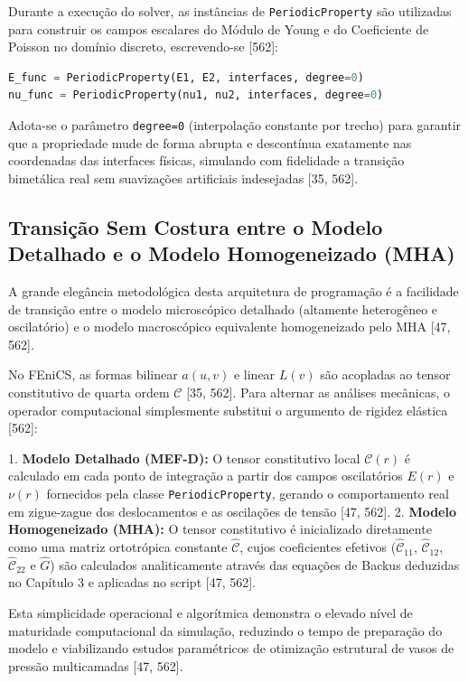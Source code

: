 Durante a execução do solver, as instâncias de \texttt{PeriodicProperty} são utilizadas para construir os campos escalares do Módulo de Young e do Coeficiente de Poisson no domínio discreto, escrevendo-se [562]:

\begin{lstlisting}[language=Python, caption={Instanciação dos campos de propriedades no script FEniCS.}]
E_func = PeriodicProperty(E1, E2, interfaces, degree=0)
nu_func = PeriodicProperty(nu1, nu2, interfaces, degree=0)
\end{lstlisting}

Adota-se o parâmetro \texttt{degree=0} (interpolação constante por trecho) para garantir que a propriedade mude de forma abrupta e descontínua exatamente nas coordenadas das interfaces físicas, simulando com fidelidade a transição bimetálica real sem suavizações artificiais indesejadas [35, 562].

\subsection{Transição Sem Costura entre o Modelo Detalhado e o Modelo Homogeneizado (MHA)}

A grande elegância metodológica desta arquitetura de programação é a facilidade de transição entre o modelo microscópico detalhado (altamente heterogêneo e oscilatório) e o modelo macroscópico equivalente homogeneizado pelo MHA [47, 562].

No FEniCS, as formas bilinear $a(u,v)$ e linear $L(v)$ são acopladas ao tensor constitutivo de quarta ordem $\mathcal{C}$ [35, 562]. Para alternar as análises mecânicas, o operador computacional simplesmente substitui o argumento de rigidez elástica [562]:

1. \textbf{Modelo Detalhado (MEF-D):} O tensor constitutivo local $\mathcal{C}(r)$ é calculado em cada ponto de integração a partir dos campos oscilatórios $E(r)$ e $\nu(r)$ fornecidos pela classe \texttt{PeriodicProperty}, gerando o comportamento real em zigue-zague dos deslocamentos e as oscilações de tensão [47, 562].
2. \textbf{Modelo Homogeneizado (MHA):} O tensor constitutivo é inicializado diretamente como uma matriz ortotrópica constante $\hat{\mathcal{C}}$, cujos coeficientes efetivos ($\hat{\mathcal{C}}_{11}$, $\hat{\mathcal{C}}_{12}$, $\hat{\mathcal{C}}_{22}$ e $\hat{G}$) são calculados analiticamente através das equações de Backus deduzidas no Capítulo 3 e aplicadas no script [47, 562].

Esta simplicidade operacional e algorítmica demonstra o elevado nível de maturidade computacional da simulação, reduzindo o tempo de preparação do modelo e viabilizando estudos paramétricos de otimização estrutural de vasos de pressão multicamadas [47, 562].

